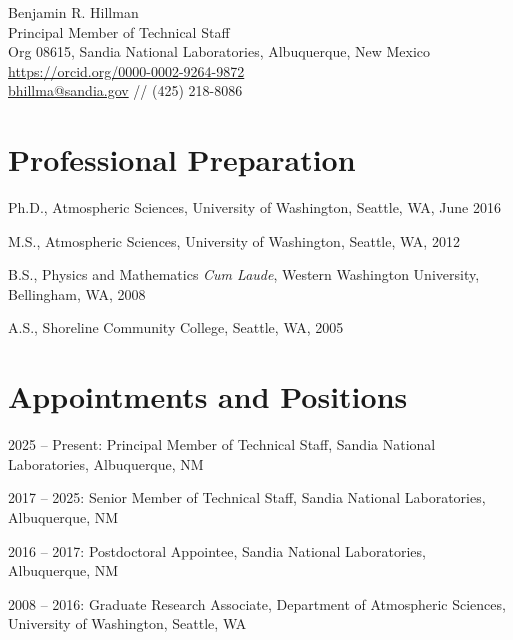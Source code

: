 \documentclass[10pt]{article}
\newenvironment{itemize*}{
   \begin{list}{}
      { 
         \setlength{\itemsep}{5pt}
         \setlength{\parsep}{0pt}
         \setlength{\topsep}{0pt}
         \setlength{\leftmargin}{0em} 
      } 
} {
   \end{list}
}
\begin{document}
{\Large Benjamin R. Hillman} \\ 
{Principal Member of Technical Staff} \\
{Org 08615, Sandia National Laboratories, Albuquerque, New Mexico} \\
{\url{https://orcid.org/0000-0002-9264-9872}} \\
{\url{bhillma@sandia.gov} // (425) 218-8086}

\section*{Professional Preparation}
\begin{itemize*}
    \item Ph.D., Atmospheric Sciences,
    University of Washington, Seattle, WA,
    June 2016
    \item M.S., Atmospheric Sciences,
    University of Washington, Seattle, WA,
    2012
    \item B.S., Physics and Mathematics \textit{Cum Laude},
    Western Washington University, Bellingham, WA,
    2008
    \item A.S.,
    Shoreline Community College, Seattle, WA,
    2005
\end{itemize*}

\section*{Appointments and Positions}
\begin{itemize*}
    \item 2025 -- Present: Principal Member of Technical Staff, Sandia National Laboratories, Albuquerque, NM
    \item 2017 -- 2025: Senior Member of Technical Staff, Sandia National Laboratories, Albuquerque, NM
    \item 2016 -- 2017: Postdoctoral Appointee, Sandia National Laboratories, Albuquerque, NM
    \item 2008 -- 2016: Graduate Research Associate, Department of Atmospheric Sciences, University of Washington, Seattle, WA
\end{itemize*}
\end{document}
